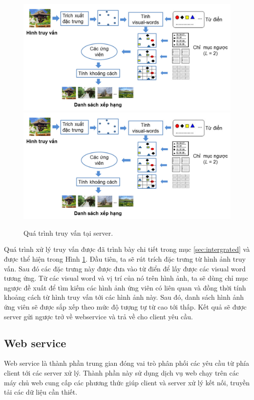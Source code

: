 \begin{figure}[!htbp]
  \begin{center}
    \leavevmode
    \ifpdf
      \includegraphics[scale=0.35]{query-process-server}
    \else
      \includegraphics[scale=0.35]{query-process-server}
    \fi
    \caption[Quá trình truy vấn tại server]{Quá trình truy vấn tại server.}
    \label{query-process-server}
  \end{center}
\end{figure}

Quá trình xử lý truy vấn được đã trình bày chi tiết trong mục \ref{sec:intergrated} và được thể hiện trong Hình \ref{query-process-server}. Đầu tiên, ta sẽ rút trích đặc trưng từ hình ảnh truy vấn. Sau đó các đặc trưng này được đưa vào từ điển để lấy được các visual word tương ứng. Từ các visual word và vị trí của nó trên hình ảnh, ta sẽ dùng chỉ mục ngược đề xuất để tìm kiếm các hình ảnh ứng viên có liên quan và đồng thời tính khoảng cách từ hình truy vấn tới các hình ảnh này. Sau đó, danh sách hình ảnh ứng viên sẽ được sắp xếp theo mức độ tượng tự từ cao tới thấp. Kết quả sẽ được server gửi ngược trở về webservice và trả về cho client yêu cầu.

\subsection{Web service}
\label{subsection:web_service}
Web service là thành phần trung gian đóng vai trò phân phối các yêu cầu từ phía client tới các server xử lý. Thành phần này sử dụng dịch vụ web chạy trên các máy chủ web cung cấp các phương thức giúp client và server xử lý kết nối, truyền tải các dữ liệu cần thiết.

